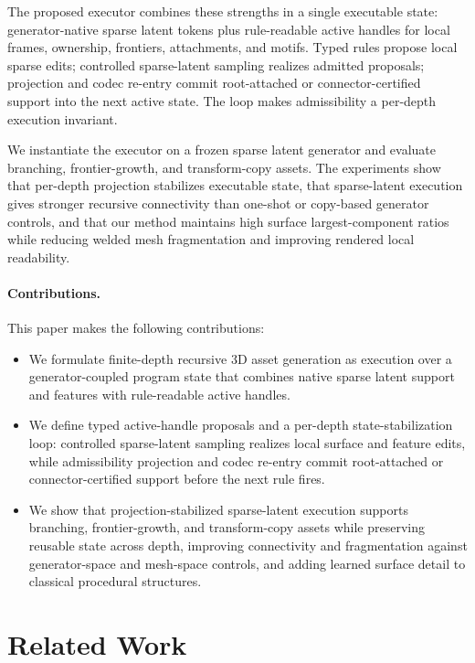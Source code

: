\documentclass[acmtog,anonymous,review]{acmart}
\begin{document}
The proposed executor combines these strengths in a single executable state: generator-native sparse latent tokens plus rule-readable active handles for local frames, ownership, frontiers, attachments, and motifs. Typed rules propose local sparse edits; controlled sparse-latent sampling realizes admitted proposals; projection and codec re-entry commit root-attached or connector-certified support into the next active state. The loop makes admissibility a per-depth execution invariant.

We instantiate the executor on a frozen sparse latent generator and evaluate branching, frontier-growth, and transform-copy assets. The experiments show that per-depth projection stabilizes executable state, that sparse-latent execution gives stronger recursive connectivity than one-shot or copy-based generator controls, and that our method maintains high surface largest-component ratios while reducing welded mesh fragmentation and improving rendered local readability.

\paragraph{Contributions.}
This paper makes the following contributions:
\begin{itemize}
  \item We formulate finite-depth recursive 3D asset generation as execution over a generator-coupled program state that combines native sparse latent support and features with rule-readable active handles.
  \item We define typed active-handle proposals and a per-depth state-stabilization loop: controlled sparse-latent sampling realizes local surface and feature edits, while admissibility projection and codec re-entry commit root-attached or connector-certified support before the next rule fires.
  \item We show that projection-stabilized sparse-latent execution supports branching, frontier-growth, and transform-copy assets while preserving reusable state across depth, improving connectivity and fragmentation against generator-space and mesh-space controls, and adding learned surface detail to classical procedural structures.
\end{itemize}

\section{Related Work}
\end{document}
